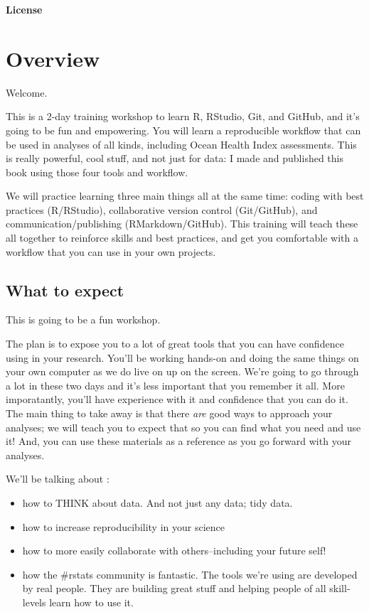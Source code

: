 \documentclass[]{book}
\providecommand{\tightlist}{%
  \setlength{\itemsep}{0pt}\setlength{\parskip}{0pt}}
\theoremstyle{definition}
\theoremstyle{definition}
\theoremstyle{definition}
\theoremstyle{remark}
\begin{document}
\textbf{License}

\hypertarget{overview}{\chapter{Overview}\label{overview}}

Welcome.

This is a 2-day training workshop to learn R, RStudio, Git, and GitHub,
and it's going to be fun and empowering. You will learn a reproducible
workflow that can be used in analyses of all kinds, including Ocean
Health Index assessments. This is really powerful, cool stuff, and not
just for data: I made and published this book using those four tools and
workflow.

We will practice learning three main things all at the same time: coding
with best practices (R/RStudio), collaborative version control
(Git/GitHub), and communication/publishing (RMarkdown/GitHub). This
training will teach these all together to reinforce skills and best
practices, and get you comfortable with a workflow that you can use in
your own projects.

\section{What to expect}\label{what-to-expect}

This is going to be a fun workshop.

The plan is to expose you to a lot of great tools that you can have
confidence using in your research. You'll be working hands-on and doing
the same things on your own computer as we do live on up on the screen.
We're going to go through a lot in these two days and it's less
important that you remember it all. More imporatantly, you'll have
experience with it and confidence that you can do it. The main thing to
take away is that there \emph{are} good ways to approach your analyses;
we will teach you to expect that so you can find what you need and use
it! And, you can use these materials as a reference as you go forward
with your analyses.

We'll be talking about :

\begin{itemize}
\tightlist
\item
  how to THINK about data. And not just any data; tidy data.
\item
  how to increase reproducibility in your science
\item
  how to more easily collaborate with others--including your future
  self!
\item
  how the \#rstats community is fantastic. The tools we're using are
  developed by real people. They are building great stuff and helping
  people of all skill-levels learn how to use it.
\end{itemize}
\end{document}
